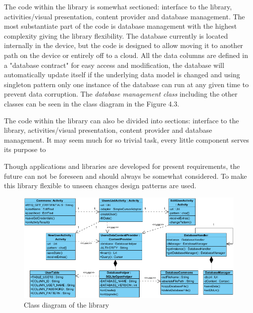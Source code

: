 The code within the library is somewhat sectioned: interface to the library, activities/visual presentation, content provider and database management. The most substantiate part of the code is database management with the highest complexity giving  the library flexibility. The database currently is located internally in the device, but the code is designed to allow moving it to another path on the device or entirely off to a cloud. All the data columns are defined in a "database contract" for easy access and modification, the database will automatically update itself if the underlying data model is changed and using singleton pattern only one instance of the database can run at any given time to prevent data corruption. The \textit{database management class} including the other classes can be seen in the class diagram in the Figure 4.3.

The code within the library can also be divided into sections: interface to the library, activities/visual presentation, content provider and database management. It may seem much for so trivial task, every little component serves its purpose to 

Though applications and libraries are developed for present requirements, the future can not be foreseen and should always be somewhat considered. To make this library flexible to unseen changes design patterns are used. 

\begin{landscape}

\begin{figure}[h]
\begin{center}
\includegraphics[scale=1.1]{images/classdiagram.png}
\caption{Class diagram of the library} \label{fig:class diagram} 
\end{center}
\end{figure}

\end{landscape}


